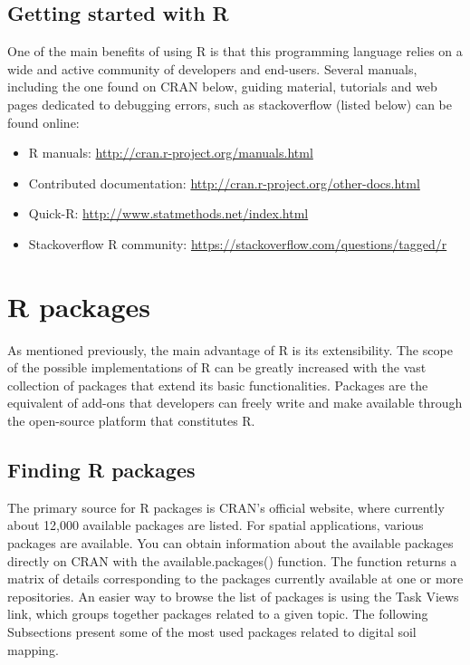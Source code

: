 \documentclass[
  10pt,
  b5paper,
]{book}
\providecommand{\tightlist}{%
  \setlength{\itemsep}{0pt}\setlength{\parskip}{0pt}}
\begin{document}
\hypertarget{getting-started-with-r}{%
\subsection{Getting started with R}\label{getting-started-with-r}}

One of the main benefits of using R is that this programming language relies on a wide and active community of developers and end-users. Several manuals, including the one found on CRAN below, guiding material, tutorials and web pages dedicated to debugging errors, such as stackoverflow (listed below) can be found online:

\begin{itemize}
\tightlist
\item
  R manuals: \url{http://cran.r-project.org/manuals.html}
\item
  Contributed documentation: \url{http://cran.r-project.org/other-docs.html}
\item
  Quick-R: \url{http://www.statmethods.net/index.html}
\item
  Stackoverflow R community: \url{https://stackoverflow.com/questions/tagged/r}
\end{itemize}

\hypertarget{r-packages}{%
\section{R packages}\label{r-packages}}

As mentioned previously, the main advantage of R is its extensibility. The scope of the possible implementations of R can be greatly increased with the vast collection of packages that extend its basic functionalities. Packages are the equivalent of add-ons that developers can freely write and make available through the open-source platform that constitutes R.

\hypertarget{finding-r-packages}{%
\subsection{Finding R packages}\label{finding-r-packages}}

The primary source for R packages is CRAN's official website, where currently about 12,000 available packages are listed. For spatial applications, various packages are available. You can obtain information about the available packages directly on CRAN with the available.packages() function. The function returns a matrix of details corresponding to the packages currently available at one or more repositories. An easier way to browse the list of packages is using the Task Views link, which groups together packages related to a given topic. The following Subsections present some of the most used packages related to digital soil mapping.
\end{document}
